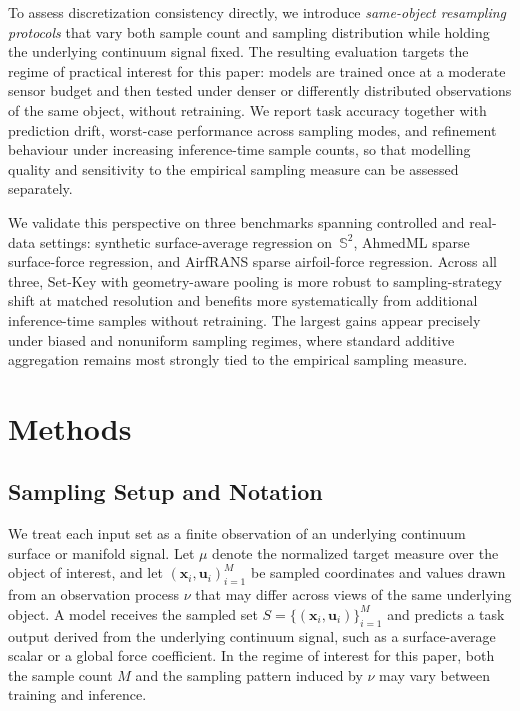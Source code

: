 \documentclass[11pt]{article}
\begin{document}
To assess discretization consistency directly, we introduce \emph{same-object resampling protocols}
that vary both sample count and sampling distribution while holding the
underlying continuum signal fixed.  The resulting evaluation targets the regime
of practical interest for this paper: models are trained once at a moderate
sensor budget and then tested under denser or differently distributed
observations of the same object, without retraining.  We report task accuracy
together with prediction drift, worst-case performance across sampling modes,
and refinement behaviour under increasing inference-time sample counts, so that
modelling quality and sensitivity to the empirical sampling measure can be
assessed separately.

We validate this perspective on three benchmarks spanning controlled and
real-data settings: synthetic surface-average regression on~$\mathbb{S}^2$,
AhmedML sparse surface-force regression, and AirfRANS sparse airfoil-force
regression.  Across all three, Set-Key with geometry-aware pooling is more
robust to sampling-strategy shift at matched resolution and benefits more
systematically from additional inference-time samples without retraining.  The
largest gains appear precisely under biased and nonuniform sampling regimes,
where standard additive aggregation remains most strongly tied to the empirical
sampling measure.

\section{Methods}
\label{sec:methods}

\subsection{Sampling Setup and Notation}
\label{sec:method-setup}

We treat each input set as a finite observation of an underlying continuum
surface or manifold signal.  Let $\mu$ denote the normalized target measure
over the object of interest, and let
$(\boldsymbol{x}_i,\boldsymbol{u}_i)_{i=1}^M$ be sampled coordinates and
values drawn from an observation process $\nu$ that may differ across views of
the same underlying object.  A model receives the sampled set
$S=\{(\boldsymbol{x}_i,\boldsymbol{u}_i)\}_{i=1}^M$ and predicts a task output
derived from the underlying continuum signal, such as a surface-average scalar
or a global force coefficient.  In the regime of interest for this paper, both
the sample count $M$ and the sampling pattern induced by $\nu$ may vary
between training and inference.
\end{document}
